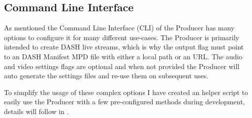 \subsection{Command Line Interface\label{sec:cli_producer}}

As mentioned the Command Line Interface (CLI) of the Producer has many options to configure it for many different use-cases. The Producer is primarily intended to create DASH live streams, which is why the output flag must point to an DASH Manifest MPD file with either a local path or an URL. The audio and video settings flags are optional and when not provided the Producer will auto generate the settings files and re-use them on subsequent uses.

To simplify the usage of these complex options I have created an helper script to easily use the Producer with a few pre-configured methods during development, details will follow in .

